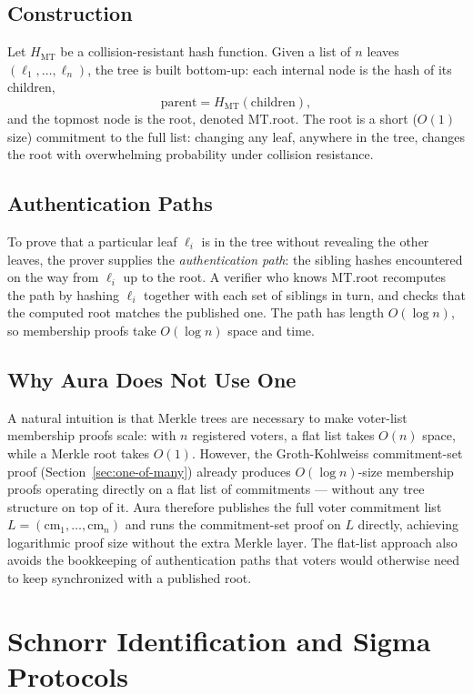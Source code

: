 \documentclass[12pt,a4paper,oneside]{report}
\begin{document}
\subsection*{Construction}
Let $H_{\text{MT}}$ be a collision-resistant hash function. Given a list 
of $n$ leaves $(\ell_1, \ldots, \ell_n)$, the tree is built bottom-up: 
each internal node is the hash of its children,
\[
    \text{parent} = H_{\text{MT}}(\text{children}),
\]
and the topmost node is the root, denoted $\text{MT.root}$. The root is 
a short ($O(1)$ size) commitment to the full list: changing any leaf, 
anywhere in the tree, changes the root with overwhelming probability 
under collision resistance.

\subsection*{Authentication Paths}
To prove that a particular leaf $\ell_i$ is in the tree without revealing 
the other leaves, the prover supplies the \textit{authentication path}: 
the sibling hashes encountered on the way from $\ell_i$ up to the root. 
A verifier who knows $\text{MT.root}$ recomputes the path by hashing 
$\ell_i$ together with each set of siblings in turn, and checks that the 
computed root matches the published one. The path has length 
$O(\log n)$, so membership proofs take $O(\log n)$ space and time.

\subsection*{Why Aura Does Not Use One}
A natural intuition is that Merkle trees are necessary to make voter-list 
membership proofs scale: with $n$ registered voters, a flat list takes 
$O(n)$ space, while a Merkle root takes $O(1)$. However, the 
Groth-Kohlweiss commitment-set proof (Section~\ref{sec:one-of-many}) 
already produces $O(\log n)$-size membership proofs operating directly 
on a flat list of commitments --- without any tree structure on top of it. 
Aura therefore publishes the full voter commitment list 
$L = (\text{cm}_1, \ldots, \text{cm}_n)$ and runs the commitment-set 
proof on $L$ directly, achieving logarithmic proof size without the 
extra Merkle layer. The flat-list approach also avoids the bookkeeping 
of authentication paths that voters would otherwise need to keep 
synchronized with a published root.
\section{Schnorr Identification and Sigma Protocols}
\label{sec:schnorr}
\end{document}
